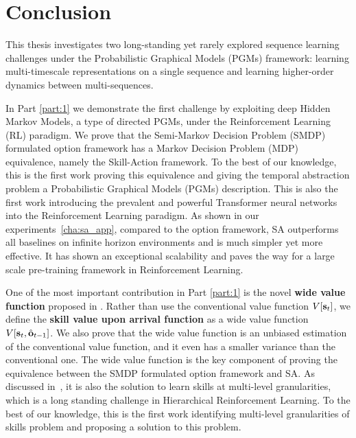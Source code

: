 
\chapter{Conclusion}
\label{cha:conclusion}


This thesis investigates two long-standing yet rarely explored
sequence learning challenges under the Probabilistic Graphical
Models (PGMs) framework: learning multi-timescale representations
on a single sequence and learning higher-order dynamics between
multi-sequences.

In Part \ref{part:1} we demonstrate the first challenge by
exploiting deep Hidden Markov Models, a type of directed PGMs,
under the Reinforcement Learning (RL) paradigm. We prove that the
Semi-Markov Decision Problem (SMDP) formulated option framework
has a Markov Decision Problem (MDP) equivalence, namely the
Skill-Action framework. To the best of our knowledge, this is the
first work proving this equivalence and giving the temporal
abstraction problem a Probabilistic Graphical Models (PGMs)
description. This is also the first work introducing the
prevalent and powerful Transformer neural networks into the
Reinforcement Learning paradigm. As shown in our
experiments~\ref{cha:sa_app}, compared to the option framework,
SA outperforms all baselines on infinite horizon environments and
is much simpler yet more effective. It has shown an exceptional
scalability and paves the way for a large scale pre-training
framework in Reinforcement Learning.

One of the most important contribution in Part \ref{part:1} is
the novel \textbf{wide value function} proposed in
. Rather than use the conventional value
function $V[{\mathbf{s}}_t]$, we define the \textbf{skill value upon
  arrival function} as a wide value function
$V[{\mathbf{s}}_t,\hat{{\mathbf{o}}}_{t-1}]$. We also prove that the wide value
function is an unbiased estimation of the conventional value
function, and it even has a smaller variance than the
conventional one. The wide value function is the key component of
proving the equivalence between the SMDP formulated option
framework and SA. As discussed in~, it is
also the solution to learn skills at multi-level granularities,
which is a long standing challenge in Hierarchical Reinforcement
Learning. To the best of our knowledge, this is the first work
identifying multi-level granularities of skills problem and
proposing a solution to this problem.

